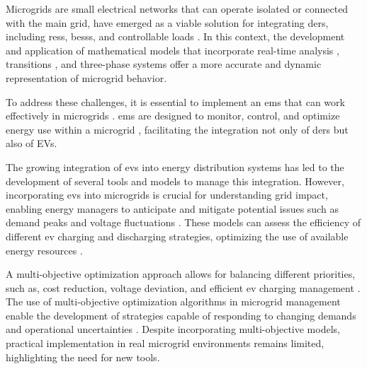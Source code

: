 \documentclass[preprint, 10pt, 5p]{elsarticle}
\begin{document}
Microgrids are small electrical networks that can operate isolated or connected
with the main grid, have emerged as a viable solution for 
integrating \glspl{der}, including \glspl{res}, \glspl{bess}, and controllable 
loads \cite{farrokhabadi2020}. In this context, the development and application 
of mathematical models that incorporate real-time analysis 
\cite{yang2019,restrepo2021}, transitions \cite{vergara2019}, 
and three-phase systems \cite{vergara2019_2} 
offer a more accurate and dynamic representation of microgrid behavior.

To address these challenges, it is essential to implement an \gls{ems} that 
can work effectively in microgrids \cite{cimen2022,kim2022}. \gls{ems} are 
designed to monitor, control, and optimize energy use within a microgrid 
\cite{ahmad2023}, 
facilitating the integration not only of \glspl{der} but also of EVs.

\begin{figure}[ht!]
    \begin{tcolorbox}[colframe=black!80!white,colback=white,sharp corners, boxrule=0.5pt, width=\linewidth]%
        \begin{scriptsize}
            
        \end{scriptsize}
    \end{tcolorbox}
    \end{figure}


The growing integration of \glspl{ev} into energy distribution systems 
\cite{banol2023, calero2024} has led to the development of several tools and 
models to manage this integration. However, incorporating \glspl{ev} into 
microgrids is crucial for understanding grid impact, enabling energy managers 
to anticipate and mitigate potential issues such as demand peaks and voltage 
fluctuations \cite{gou2022}. These models can assess 
the efficiency of different \gls{ev} charging and discharging strategies, 
optimizing the use of available energy resources 
\cite{kayode2022, masrur2022}.



A multi-objective optimization approach allows for balancing different 
priorities, such as, cost reduction, voltage deviation, and 
efficient \gls{ev} charging management \cite{zandrazavi2022, li2024}. 
The use of multi-objective 
optimization algorithms \cite{abid24} in microgrid management 
enable the development of strategies capable of responding to changing demands and 
operational 
uncertainties \cite{zhang2022, mei2022}. Despite incorporating 
multi-objective models, practical implementation in real 
microgrid environments remains limited, highlighting the need 
for new tools.
\end{document}
